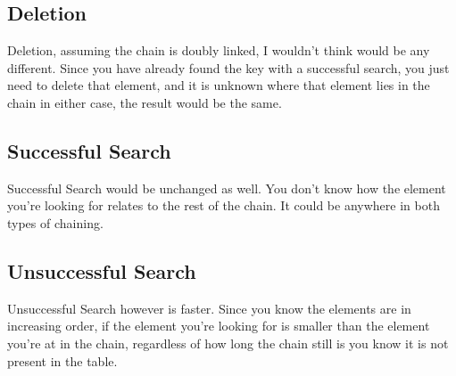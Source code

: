 \documentclass[12pt]{article}
\begin{document}
\subsection{Deletion}

Deletion, assuming the chain is doubly linked, I wouldn't think would be any different. Since you have already found the key with a successful search, you just need to delete that element, and it is unknown where that element lies in the chain in either case, the result would be the same.

\subsection{Successful Search}

Successful Search would be unchanged as well. You don't know how the element you're looking for relates to the rest of the chain. It could be anywhere in both types of chaining.

\subsection{Unsuccessful Search}

Unsuccessful Search however is faster. Since you know the elements are in increasing order, if the element you're looking for is smaller than the element you're at in the chain, regardless of how long the chain still is you know it is not present in the table.
\end{document}
